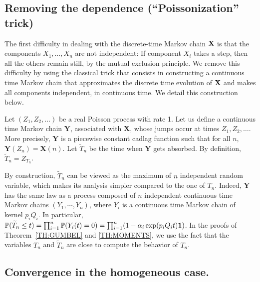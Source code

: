 \documentclass{aptpub}
\newcommand\proba[1]{\mathchoice{\bproba{#1}}{\sproba{#1}}{\sproba{#1}}{\sproba{#1}}}
\newcommand\bproba[1]{\mathbb{P}\left(#1\right)}
\newcommand\sproba[1]{\mathbb{P}(#1)}
\newcommand\bX{\mathbf{X}}
\newcommand\bY{\mathbf{Y}}
\begin{document}
\subsection{Removing the dependence (``Poissonization'' trick)}
\label{ssec:poisson}

The first difficulty in dealing with the discrete-time Markov chain
${\bf X}$ is that the components $X_1,\dots,X_n$ are not independent: If
component $X_i$ takes a step, then all the others remain still, by the
mutual exclusion principle.  We remove this difficulty by using the
classical trick that consists in constructing a continuous time Markov
chain that approximates the discrete time evolution of ${\bf X}$ and
makes all components independent, in continuous time. We detail this
construction below.


Let $(Z_1,Z_2,\ldots )$ be a real Poisson process  with rate 1.
Let us define a continuous time Markov chain $\bY $,
associated with $\bX$, whose jumps occur at times  $Z_1,Z_2,\ldots $.
More precisely, $\bY$ is a piecewise constant cadlag function such that
for all $n$,  $\bY(Z_n) = \bX(n)$.
Let  $\widetilde{T}_n$ be  the time when $\bY$ gets absorbed.
By definition,  $\widetilde{T}_n = Z_{T_n}$.

By construction, $\widetilde{T}_n$ can be viewed as the maximum of $n$
independent random variable, which makes its analysis simpler compared
to the one of $T_n$. Indeed, $\bY$ has the same law as a process
composed of $n$ independent continuous time Markov chains
$(Y_1,\cdots,Y_n)$, where ${Y}_i$ is a continuous time Markov chain of
kernel $p_iQ_i$. In particular,
$\sproba{\widetilde{T}_n\le t} = \prod_{i=1}^n\proba{Y_i(t)=0} =
\prod_{i=1}^n (1-\alpha_i \exp(p_iQ_it)\mathbf{1})$.
In the proofs of Theorem~\ref{TH:GUMBEL} and \ref{TH:MOMENTS}, we
use the fact that  the variables $T_n$ and
$\tilde{T}_n$ are close to compute the behavior of $T_n$.




\subsection{Convergence in the homogeneous case.}

\label{sec:homo}
\end{document}
